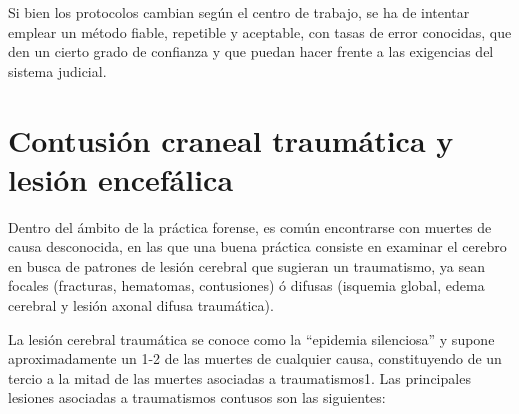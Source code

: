 Si bien los protocolos cambian según el centro de trabajo, se ha de intentar emplear un método fiable, repetible y aceptable, con tasas de error conocidas, que den un cierto grado de confianza y que puedan hacer frente a las exigencias del sistema judicial.

\section{Contusión craneal traumática y lesión encefálica}
Dentro del ámbito de la práctica forense, es común encontrarse con muertes de causa desconocida, en las que una buena práctica consiste en examinar el cerebro en busca de patrones de lesión cerebral que sugieran un traumatismo, ya sean focales (fracturas, hematomas, contusiones) ó difusas (isquemia global, edema cerebral y lesión axonal difusa traumática).

La lesión cerebral traumática se conoce como la “epidemia silenciosa” y supone aproximadamente un 1-2 de las muertes de cualquier causa, constituyendo de un tercio a la mitad de las muertes asociadas a traumatismos1. Las principales lesiones asociadas a traumatismos contusos son las siguientes:

